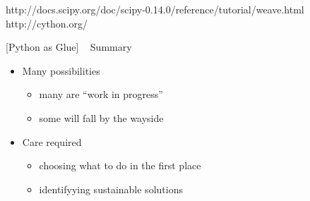 \documentclass{article}
\begin{document}
http://docs.scipy.org/doc/scipy-0.14.0/reference/tutorial/weave.html
http://cython.org/

    {[}Python as Glue{]} ~ Summary

\begin{itemize}
\itemsep1pt\parskip0pt
\item
  Many possibilities

  \begin{itemize}
  \itemsep1pt\parskip0pt
  \item
    many are ``work in progress''
  \item
    some will fall by the wayside
  \end{itemize}
\item
  Care required

  \begin{itemize}
  \itemsep1pt\parskip0pt
  \item
    choosing what to do in the first place
  \item
    identifyying sustainable solutions
  \end{itemize}
\end{itemize}


    
    
    
    
\end{document}
